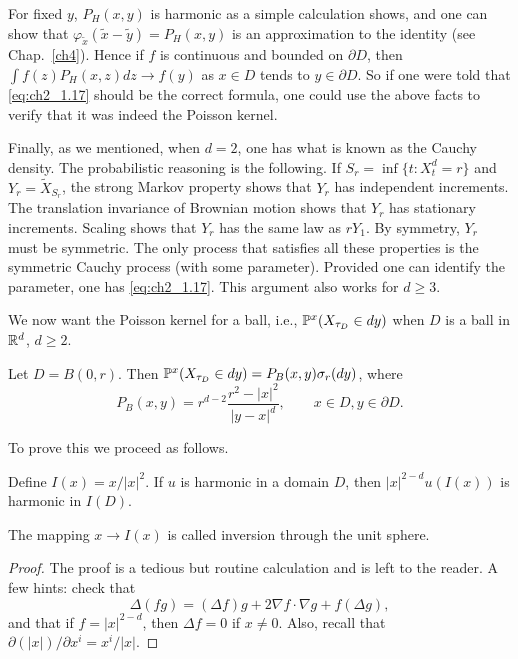 For fixed $y$, $P_H(x,y)$ is harmonic as a simple calculation shows, and one can show that $\varphi_{\widetilde{x}}(\widetilde{x}-\widetilde{y}) = P_H(x,y)$ is an approximation to the identity (see Chap.\ \ref{ch4}). Hence if $f$ is continuous and bounded on $\partial D$, then $\int f(z)P_H(x,z)dz \to f(y)$ as $x \in D$ tends to $y \in \partial D$. So if one were told that \eqref{eq:ch2_1.17} should be the correct formula, one could use the above facts to verify that it was indeed the Poisson kernel.

Finally, as we mentioned, when $d = 2$, one has what is known as the Cauchy density. The probabilistic reasoning is the following. If $S_r = \inf\{t : X_t^d = r\}$ and $Y_r = \widetilde{X}_{S_r}$, the strong Markov property shows that $Y_r$ has independent increments. The translation invariance of Brownian motion shows that $Y_r$ has stationary increments. Scaling shows that $Y_r$ has the same law as $rY_1$. By symmetry, $Y_r$ must be symmetric. The only process that satisfies all these properties is the symmetric Cauchy process (with some parameter). Provided one can identify the parameter, one has \eqref{eq:ch2_1.17}. This argument also works for $d \geq 3$.

We now want the Poisson kernel for a ball, i.e., $\P^x(X_{\tau_D} \in dy)$ when $D$ is a ball in $\R^d$, $d \geq 2$.

\begin{theorem}\label{thm:ch2_1.17}
Let $D = B(0,r)$. Then $\P^x(X_{\tau_D} \in dy) = P_B(x,y)\sigma_r(dy)$, where
\[
    P_B(x,y) = r^{d-2}\frac{r^2-|x|^2}{|y-x|^d}, \qquad x \in D, y \in \partial D.
\]
\end{theorem}

To prove this we proceed as follows.

\begin{lemma}\label{lem:ch2_1.18}
Define $I(x) = x/|x|^2$. If $u$ is harmonic in a domain $D$, then $|x|^{2-d}u(I(x))$ is harmonic in $I(D)$.
\end{lemma}

The mapping $x \to I(x)$ is called inversion through the unit sphere.

\begin{proof}
The proof is a tedious but routine calculation and is left to the reader. A few hints: check that
\[
    \Delta(fg) = (\Delta f)g + 2\nabla f \cdot \nabla g + f(\Delta g),
\]
and that if $f = |x|^{2-d}$, then $\Delta f = 0$ if $x \neq 0$. Also, recall that $\partial(|x|)/\partial x^i = x^i/|x|$.
\end{proof}

